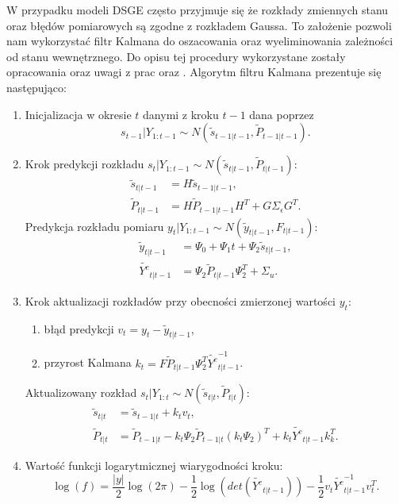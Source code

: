 W przypadku modeli DSGE często przyjmuje się że rozkłady zmiennych stanu oraz błędów pomiarowych są zgodne z rozkładem Gaussa. To założenie pozwoli nam wykorzystać filtr Kalmana do oszacowania oraz wyeliminowania zależności od stanu wewnętrznego. Do opisu tej procedury wykorzystane zostały opracowania oraz uwagi z prac \cite{herbst} oraz \cite{laaraiedh2012implementation}. Algorytm filtru Kalmana prezentuje się następująco:
\begin{algDefinition}
\begin{enumerate}
    \item Inicjalizacja w okresie $t$ danymi z kroku $t-1$ dana poprzez 
    \begin{equation}
        s_{t-1}|Y_{1:t-1} \sim N(\tilde{s}_{t-1|t-1},\tilde{P}_{t-1|t-1}).
    \end{equation}
    \item Krok predykcji rozkładu $s_t|Y_{1:t-1} \sim N(\tilde{s}_{t|t-1},\tilde{P}_{t|t-1})$:
    \begin{align}
        \tilde{s}_{t|t-1} &= H \tilde{s}_{t-1|t-1}, \\
        \tilde{P}_{t|t-1} &= H \tilde{P}_{t-1|t-1} H^T + G \Sigma_{\epsilon} G^T.
    \end{align}
    Predykcja rozkładu pomiaru $y_t|Y_{1:t-1} \sim N(\tilde{y}_{t|t-1},F_{t|t-1})$:
    \begin{align}
        \tilde{y}_{t|t-1} &= \Psi_0 + \Psi_1 t + \Psi_2\tilde{s}_{t|t-1},\\
        \tilde{Y^{c}}_{t|t-1} &= \Psi_2\tilde{P}_{t|t-1}\Psi_2^T + \Sigma_{u}.
    \end{align}
    \item Krok aktualizacji rozkładów przy obecności zmierzonej wartości $y_t$:
    \begin{enumerate}
        \item błąd predykcji $v_t = y_t - \tilde{y}_{t|t-1}$,
        \item przyrost Kalmana $k_t = F \tilde{P}_{t|t-1} \Psi_2^T \tilde{Y^{c}}_{t|t-1}^{-1}$.
    \end{enumerate}
    Aktualizowany rozkład $s_{t}|Y_{1:t} \sim N(\tilde{s}_{t|t},\tilde{P}_{t|t})$:
        \begin{align}
            \tilde{s}_{t|t} &= \tilde{s}_{t-1|t} + k_t v_t,\\
            \tilde{P}_{t|t} &= \tilde{P}_{t-1|t} - k_t \Psi_2 \tilde{P}_{t-1|t} \left(k_t \Psi_2\right)^T  + k_t \tilde{Y^{c}}_{t|t-1} k_k^T.
        \end{align}
    \item Wartość funkcji logarytmicznej wiarygodności kroku:
        \begin{equation}
            \log{(f)} = \frac{|y|}{2}\log{(2\pi)} - \frac{1}{2}\log{(det(\tilde{Y^{c}}_{t|t-1}))} - \frac{1}{2} v_t \tilde{Y^{c}}_{t|t-1}^{-1} v_t^T.
        \end{equation}
\end{enumerate}
\end{algDefinition}
